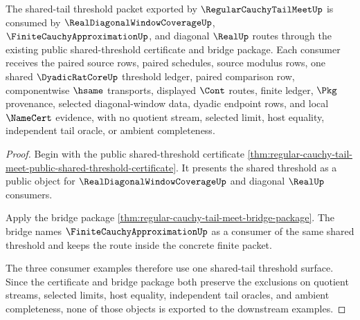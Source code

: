 \begin{theorem}
\label{thm:regular-cauchy-tail-meet-mature-downstream-examples}
The shared-tail threshold packet exported by $\RegularCauchyTailMeetUp$ is consumed by $\RealDiagonalWindowCoverageUp$, $\FiniteCauchyApproximationUp$, and diagonal $\RealUp$ routes through the existing public shared-threshold certificate and bridge package. Each consumer receives the paired source rows, paired schedules, source modulus rows, one shared $\DyadicRatCoreUp$ threshold ledger, paired comparison row, componentwise $\hsame$ transports, displayed $\Cont$ routes, finite ledger, $\Pkg$ provenance, selected diagonal-window data, dyadic endpoint rows, and local $\NameCert$ evidence, with no quotient stream, selected limit, host equality, independent tail oracle, or ambient completeness.
\end{theorem}
\begin{proof}
Begin with the public shared-threshold certificate \autoref{thm:regular-cauchy-tail-meet-public-shared-threshold-certificate}. It presents the shared threshold as a public object for $\RealDiagonalWindowCoverageUp$ and diagonal $\RealUp$ consumers.

Apply the bridge package \autoref{thm:regular-cauchy-tail-meet-bridge-package}. The bridge names $\FiniteCauchyApproximationUp$ as a consumer of the same shared threshold and keeps the route inside the concrete finite packet.

The three consumer examples therefore use one shared-tail threshold surface. Since the certificate and bridge package both preserve the exclusions on quotient streams, selected limits, host equality, independent tail oracles, and ambient completeness, none of those objects is exported to the downstream examples.
\end{proof}

